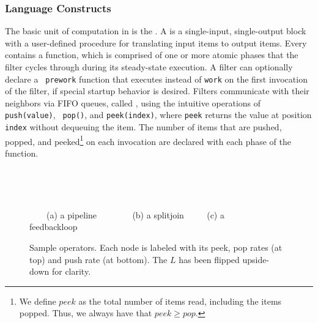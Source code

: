 \documentclass{sig-alt-full}
\begin{document}
\subsubsection{Language Constructs}

The basic unit of computation in {\StreamIt} is the {\filter}. A
{\filter} is a single-input, single-output block with a user-defined
procedure for translating input items to output items.  Every
{\filter} contains a {\work} function, which is comprised of one or
more atomic phases that the filter cycles through during its
steady-state execution. A filter can optionally declare a {\tt
prework} function that executes instead of {\tt work} on the first
invocation of the filter, if special startup behavior is desired.
Filters communicate with their neighbors via FIFO queues, called
{\Channels}, using the intuitive operations of {\tt push(value)}, {\tt
pop()}, and {\tt peek(index)}, where {\tt peek} returns the value at
position {\tt index} without dequeuing the item.  The number of items
that are pushed, popped, and peeked\footnote{{\small We define $peek$
as the total number of items read, including the items popped.  Thus,
we always have that $peek \ge pop$.}} on each invocation are declared
with each phase of the {\work} function.

\begin{figure}
\begin{center}

\begin{minipage}{0.7in}
\centering {}
\end{minipage}
~~~~~~
\begin{minipage}{0.8in}
\centering {}
\end{minipage}
~~~~~~
\begin{minipage}{0.8in}
\centering {}
\end{minipage}

\vspace{0.1in}

{\small ~~~~(a) a pipeline ~~~~~~~ (b) a splitjoin ~~~~ (c) a feedbackloop~~~~}

\caption{\small Sample {\StreamIt} operators.  Each node is labeled
with its peek, pop rates (at top) and push rate (at bottom).  The $L$
{\filter} has been flipped upside-down for clarity.
\label{fig:steady-state}}
\vspace{-18pt}
\end{center}
\end{figure}
\end{document}

